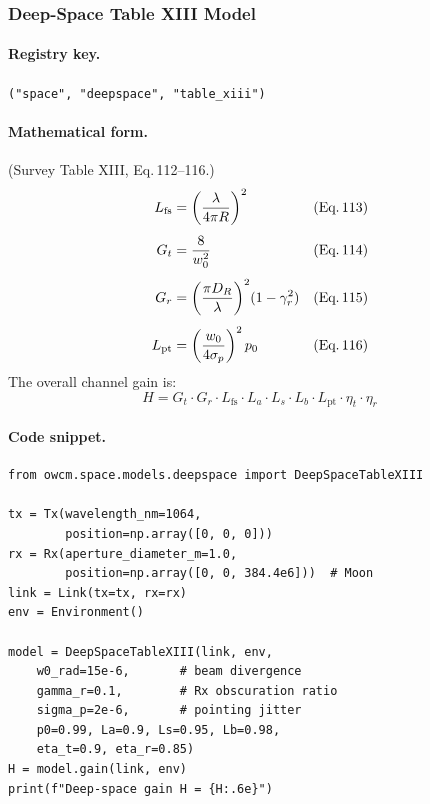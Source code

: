 \documentclass[11pt,a4paper]{article}
\begin{document}
\subsubsection{Deep-Space Table XIII Model}
\label{sec:deepspace}

\paragraph{Registry key.} \texttt{("space", "deepspace", "table\_xiii")}

\paragraph{Mathematical form.}
(Survey Table XIII, Eq.\,112--116.)
\begin{align}
L_{\text{fs}} &= \left(\frac{\lambda}{4\pi R}\right)^2
  & &\text{(Eq.\,113)} \\[4pt]
G_t &= \frac{8}{w_0^2}
  & &\text{(Eq.\,114)} \\[4pt]
G_r &= \left(\frac{\pi D_R}{\lambda}\right)^2\!(1 - \gamma_r^2)
  & &\text{(Eq.\,115)} \\[4pt]
L_{\text{pt}} &= \left(\frac{w_0}{4\sigma_p}\right)^2 p_0
  & &\text{(Eq.\,116)}
\end{align}
The overall channel gain is:
\begin{equation}
\boxed{H = G_t \cdot G_r \cdot L_{\text{fs}} \cdot L_a \cdot L_s \cdot L_b
  \cdot L_{\text{pt}} \cdot \eta_t \cdot \eta_r}
\end{equation}

\paragraph{Code snippet.}
\begin{lstlisting}
from owcm.space.models.deepspace import DeepSpaceTableXIII

tx = Tx(wavelength_nm=1064,
        position=np.array([0, 0, 0]))
rx = Rx(aperture_diameter_m=1.0,
        position=np.array([0, 0, 384.4e6]))  # Moon
link = Link(tx=tx, rx=rx)
env = Environment()

model = DeepSpaceTableXIII(link, env,
    w0_rad=15e-6,       # beam divergence
    gamma_r=0.1,        # Rx obscuration ratio
    sigma_p=2e-6,       # pointing jitter
    p0=0.99, La=0.9, Ls=0.95, Lb=0.98,
    eta_t=0.9, eta_r=0.85)
H = model.gain(link, env)
print(f"Deep-space gain H = {H:.6e}")
\end{lstlisting}
\end{document}
